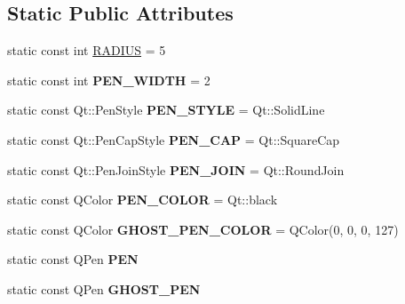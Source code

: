 \subsection*{Static Public Attributes}
\begin{DoxyCompactItemize}
\item 
static const int \hyperlink{classPplGUI_aa86753ab1d23b8aaa73f9fc20ca75449}{R\-A\-D\-I\-U\-S} = 5
\item 
\hypertarget{classPplGUI_a472efdfe83788f4b6e51f82b6d4fea1d}{static const int {\bfseries P\-E\-N\-\_\-\-W\-I\-D\-T\-H} = 2}\label{classPplGUI_a472efdfe83788f4b6e51f82b6d4fea1d}

\item 
\hypertarget{classPplGUI_a84984104fb0e25bfd7e15e7e55b6bae7}{static const Qt\-::\-Pen\-Style {\bfseries P\-E\-N\-\_\-\-S\-T\-Y\-L\-E} = Qt\-::\-Solid\-Line}\label{classPplGUI_a84984104fb0e25bfd7e15e7e55b6bae7}

\item 
\hypertarget{classPplGUI_aa62278888ec92a1c333eae538f4f6f3f}{static const Qt\-::\-Pen\-Cap\-Style {\bfseries P\-E\-N\-\_\-\-C\-A\-P} = Qt\-::\-Square\-Cap}\label{classPplGUI_aa62278888ec92a1c333eae538f4f6f3f}

\item 
\hypertarget{classPplGUI_a4d60f70be938573fa65312c1809dea4b}{static const Qt\-::\-Pen\-Join\-Style {\bfseries P\-E\-N\-\_\-\-J\-O\-I\-N} = Qt\-::\-Round\-Join}\label{classPplGUI_a4d60f70be938573fa65312c1809dea4b}

\item 
\hypertarget{classPplGUI_aacdfeb01d44ed21ad38850114ecfd351}{static const Q\-Color {\bfseries P\-E\-N\-\_\-\-C\-O\-L\-O\-R} = Qt\-::black}\label{classPplGUI_aacdfeb01d44ed21ad38850114ecfd351}

\item 
\hypertarget{classPplGUI_a582ad86f1d58b82abcd0c668ed851100}{static const Q\-Color {\bfseries G\-H\-O\-S\-T\-\_\-\-P\-E\-N\-\_\-\-C\-O\-L\-O\-R} = Q\-Color(0, 0, 0, 127)}\label{classPplGUI_a582ad86f1d58b82abcd0c668ed851100}

\item 
\hypertarget{classPplGUI_a349527436240716995da703c6bf6f40f}{static const Q\-Pen {\bfseries P\-E\-N}}\label{classPplGUI_a349527436240716995da703c6bf6f40f}

\item 
\hypertarget{classPplGUI_a66c4ea9d3d59218dca5d7b6679ddb2e6}{static const Q\-Pen {\bfseries G\-H\-O\-S\-T\-\_\-\-P\-E\-N}}\label{classPplGUI_a66c4ea9d3d59218dca5d7b6679ddb2e6}


\end{DoxyCompactItemize}
